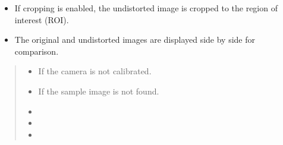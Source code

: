 \documentclass[letterpaper,10pt,english]{sphinxmanual}
\begin{document}
\begin{fulllineitems}
\begin{fulllineitems}
\begin{itemize}
\item {} 
\sphinxAtStartPar
If cropping is enabled, the undistorted image is cropped to the region of interest (ROI).

\item {} 
\sphinxAtStartPar
The original and undistorted images are displayed side by side for comparison.

\end{itemize}
\begin{quote}\begin{description}
\begin{itemize}
\item {} 
\sphinxAtStartPar
{} \textendash{} If the camera is not calibrated.

\item {} 
\sphinxAtStartPar
{} \textendash{} If the sample image is not found.

\item {} 
\sphinxAtStartPar
{} \textendash{} 

\item {} 
\sphinxAtStartPar
\sphinxstyleliteralstrong{\sphinxupquote{\sphinxhyphen{}\sphinxhyphen{}\sphinxhyphen{}\sphinxhyphen{}\sphinxhyphen{}}} \textendash{} 

\item {} 
\sphinxAtStartPar
{} \textendash{} 

\end{itemize}

\end{description}\end{quote}

\end{fulllineitems}


\end{fulllineitems}

\end{document}
